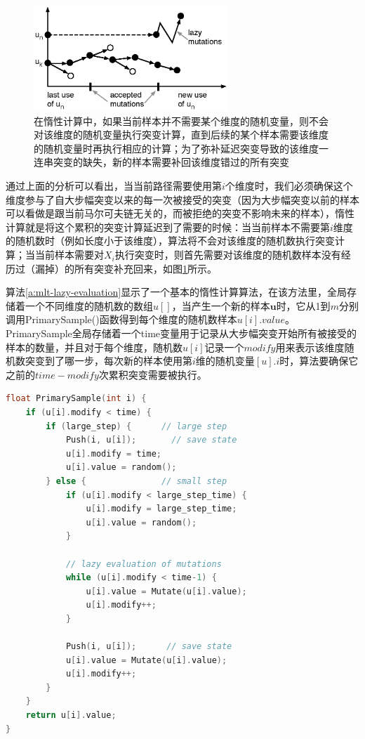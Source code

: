 \begin{figure}
	\sidecaption
	\includegraphics[width=0.65\textwidth]{figures/mlt/lazy}
	\caption{在惰性计算中，如果当前样本并不需要某个维度的随机变量，则不会对该维度的随机变量执行突变计算，直到后续的某个样本需要该维度的随机变量时再执行相应的计算；为了弥补延迟突变导致的该维度一连串突变的缺失，新的样本需要补回该维度错过的所有突变}
	\label{f:mlt-lazy}
\end{figure}

通过上面的分析可以看出，当当前路径需要使用第$i$个维度时，我们必须确保这个维度参与了自大步幅突变以来的每一次被接受的突变（因为大步幅突变以前的样本可以看做是跟当前马尔可夫链无关的，而被拒绝的突变不影响未来的样本），惰性计算就是将这个累积的突变计算延迟到了需要的时候：当当前样本不需要第$i$维度的随机数时（例如长度小于该维度），算法将不会对该维度的随机数执行突变计算；当当前样本需要对$X_i$执行突变时，则首先需要对该维度的随机数样本没有经历过（漏掉）的所有突变补充回来，如图\ref{f:mlt-lazy}所示。

算法\ref{a:mlt-lazy-evaluation}显示了一个基本的惰性计算算法，在该方法里，全局存储着一个不同维度的随机数的数组$u[]$，当产生一个新的样本$\mathbf{u}$时，它从1到$m$分别调用PrimarySample()函数得到每个维度的随机数样本$u[i].value$。PrimarySample全局存储着一个time变量用于记录从大步幅突变开始所有被接受的样本的数量，并且对于每个维度，随机数$u[i]$记录一个$modify$用来表示该维度随机数突变到了哪一步，每次新的样本使用第$i$维的随机变量$[u].i$时，算法要确保它之前的$time-modify$次累积突变需要被执行。

\begin{algorithm}
\begin{lstlisting}[language=C++, mathescape]
float PrimarySample(int i) { 
	if (u[i].modify < time) {
		if (large_step) {      // large step
			Push(i, u[i]);       // save state
			u[i].modify = time;
			u[i].value = random();
		} else {               // small step
			if (u[i].modify < large_step_time) {
				u[i].modify = large_step_time;
				u[i].value = random();
			}
			
			// lazy evaluation of mutations 
			while (u[i].modify < time-1) {
				u[i].value = Mutate(u[i].value);
				u[i].modify++;
			}
			
			Push(i, u[i]);      // save state
			u[i].value = Mutate(u[i].value);
			u[i].modify++;
		} 
	}
	return u[i].value;
}
\end{lstlisting}
\caption{获取每个原采样空间第$i$维的[0,1]随机变量的伪代码}
\label{a:mlt-lazy-evaluation}
\end{algorithm}

